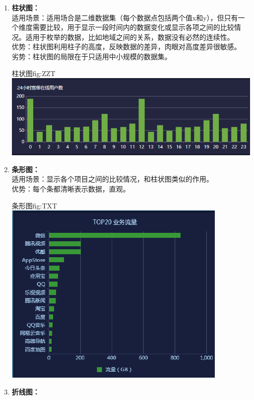 \documentclass{HustGraduPaper}
\begin{document}
    \begin{enumerate}
        \item {\bfseries 柱状图：\\}
        适用场景：适用场合是二维数据集（每个数据点包括两个值x和y），但只有一个维度需要比较，用于显示一段时间内的数据变化或显示各项之间的比较情况。适用于枚举的数据，比如地域之间的关系，数据没有必然的连续性。\\
        优势：柱状图利用柱子的高度，反映数据的差异，肉眼对高度差异很敏感。\\
        劣势：柱状图的局限在于只适用中小规模的数据集。
        \begin{generalfig}{柱状图}{fig:ZZT} 
            \includegraphics[width = \textwidth]{Figures/ZZT.png}
        \end{generalfig}
        \item {\bfseries 条形图：\\}
        适用场景：显示各个项目之间的比较情况，和柱状图类似的作用。\\
        优势：每个条都清晰表示数据，直观。
        \begin{generalfig}{条形图}{fig:TXT} 
            \includegraphics[scale = 1]{Figures/TXT.png}
        \end{generalfig}
        \item {\bfseries 折线图：\\}

\end{enumerate}
\end{document}
